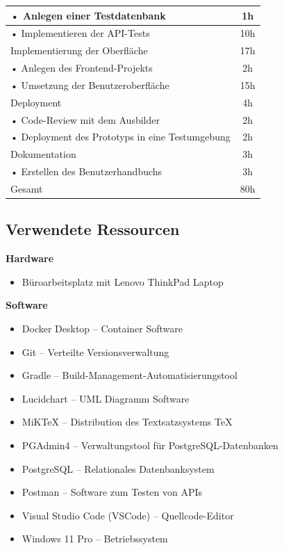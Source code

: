 \documentclass[a4paper,12pt]{article}
\begin{document}
\begin{tabular}{|p{\textwidth}|c|}
    \hline
    \hspace{0.5cm}• Anlegen einer Testdatenbank & 1h \\
    \hline
    \hspace{0.5cm}• Implementieren der API-Tests & 10h \\
    \hline
    \rowcolor{gray}Implementierung der Oberfläche & 17h \\
    \hline
    \hspace{0.5cm}• Anlegen des Frontend-Projekts & 2h \\
    \hline
    \hspace{0.5cm}• Umsetzung der Benutzeroberfläche & 15h \\
    \hline
    \rowcolor{gray}Deployment & 4h \\
    \hline
    \hspace{0.5cm}• Code-Review mit dem Ausbilder & 2h \\
    \hline
    \hspace{0.5cm}• Deployment des Prototyps in eine Testumgebung & 2h \\
    \hline
    \rowcolor{gray}Dokumentation & 3h \\
    \hline
    \hspace{0.5cm}• Erstellen des Benutzerhandbuchs & 3h \\
    \hline
    \rowcolor{gray}Gesamt & 80h \\
    \hline
\end{tabular}

\clearpage
\subsection{Verwendete Ressourcen}
\label{sec:ressourcen}

\noindent\textbf{Hardware}
\begin{itemize}
\item Büroarbeitsplatz mit Lenovo ThinkPad Laptop
\end{itemize}

\noindent\textbf{Software}
\begin{itemize}
\item Docker Desktop – Container Software
\item Git – Verteilte Versionsverwaltung
\item Gradle – Build-Management-Automatisierungstool
\item Lucidchart – UML Diagramm Software
\item MiKTeX – Distribution des Textsatzsystems \TeX
\item PGAdmin4 – Verwaltungstool für PostgreSQL-Datenbanken
\item PostgreSQL – Relationales Datenbanksystem
\item Postman – Software zum Testen von APIs
\item Visual Studio Code (VSCode) – Quellcode-Editor
\item Windows 11 Pro – Betriebssystem
\end{itemize}
\end{document}
